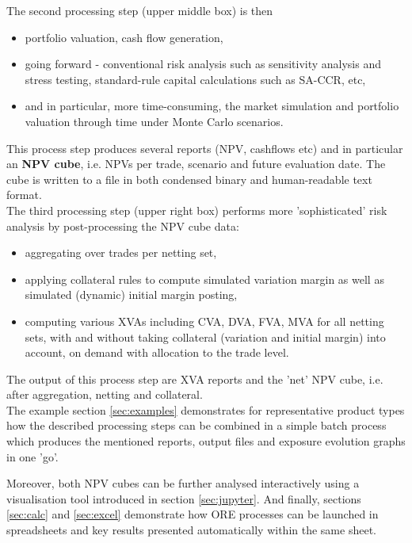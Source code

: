 \documentclass[12pt, a4paper]{article}
\begin{document}
The second processing step (upper middle box) is then 
\begin{itemize}
\item portfolio valuation, cash flow generation,
\item going forward - conventional risk analysis such as sensitivity analysis and stress testing, standard-rule capital
  calculations such as SA-CCR, etc,
\item and in particular, more time-consuming, the market simulation and portfolio valuation through time under Monte
  Carlo scenarios.
\end{itemize}
This process step produces several reports (NPV, cashflows etc) and in particular an {\bf NPV cube}, i.e. NPVs per
trade, scenario and future evaluation date. The cube is written to a file in both condensed binary and human-readable
text format.  \\

The third processing step (upper right box) performs more 'sophisticated' risk ana\-ly\-sis by post-processing the NPV
cube data:
\begin{itemize}
\item aggregating over trades per netting set, 
\item applying collateral rules to compute simulated variation margin as well as simulated (dynamic) initial margin
  posting,
\item computing various XVAs including CVA, DVA, FVA, MVA for all netting sets, with and without taking collateral
  (variation and initial margin) into account, on demand with allocation to the trade level.
\end{itemize}
The output of this process step are XVA reports and the 'net' NPV cube, i.e. after aggregation, netting and collateral. \\

The example section \ref{sec:examples} demonstrates for representative product types how the described processing steps
can be combined in a simple batch process which produces the mentioned reports, output files and exposure evolution
graphs in one 'go'.

Moreover, both NPV cubes can be further analysed interactively using a visualisation tool introduced in section
\ref{sec:jupyter}. And finally, sections \ref{sec:calc} and \ref{sec:excel} demonstrate how ORE processes can be
launched in spreadsheets and key results presented automatically within the same sheet.

\end{document}
